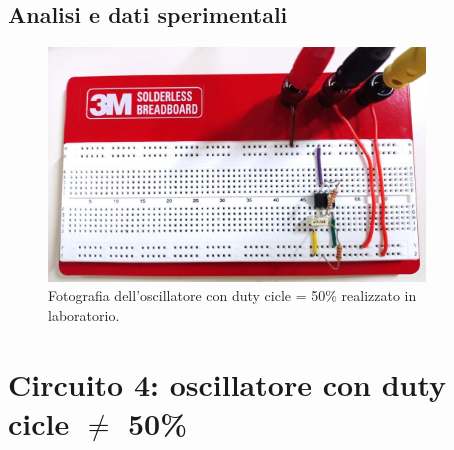 \documentclass{report}
\begin{document}
\subsection{Analisi e dati sperimentali}
\begin{figure}[h]
	\centering
	\includegraphics[height=6.2cm]{immagini/circuito3}
	\caption{Fotografia dell'oscillatore con duty cicle = 50\% realizzato in laboratorio.}
	\label{figura:circuito3}
\end{figure}

\section{Circuito 4: oscillatore con duty cicle $\neq$ 50\%}
\end{document}
